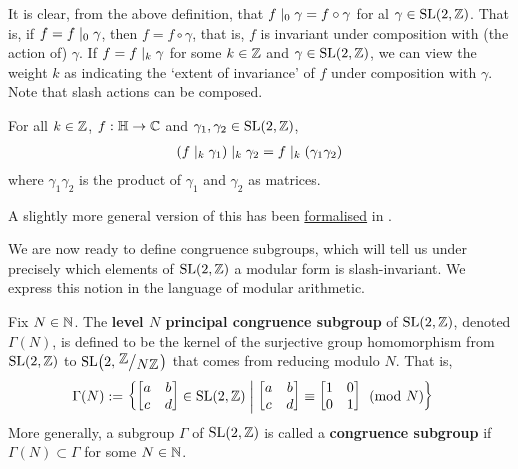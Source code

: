 It is clear, from the above definition, that $f \mid_0 \gamma = f \circ \gamma$ for al $\gamma \in \operatorname{SL}\!\left( 2, \mathbb{Z} \right)$. That is, if $f = f \mid_0 \gamma$, then $f = f \circ \gamma$, that is, $f$ is invariant under composition with (the action of) $\gamma$. If $f = f \mid_k \gamma$ for some $k \in \mathbb{Z}$ and $\gamma \in \operatorname{SL}\!\left( 2, \mathbb{Z} \right)$, we can view the weight $k$ as indicating the `extent of invariance' of $f$ under composition with $\gamma$. Note that slash actions can be composed.

\begin{boxlemma}\label{Ch2:Lemma:Slash_Mul}
    For all $k \in \mathbb{Z}$, $f : \mathbb{H} \to \mathbb{C}$ and $\gamma_1, \gamma_2 \in \operatorname{SL}\!\left( 2, \mathbb{Z} \right)$,
    \begin{align*}
        \left( f \mid_k \gamma_1 \right) \mid_k \gamma_2 = f \mid_k \left( \gamma_1 \gamma_2 \right)
    \end{align*}
    where $\gamma_1 \gamma_2$ is the product of $\gamma_1$ and $\gamma_2$ as matrices.
\end{boxlemma}
A slightly more general version of this has been \href{https://github.com/leanprover-community/mathlib4/blob/a0370507e2922f0a329a2d8cc17e9f9148cd168d/Mathlib/NumberTheory/ModularForms/SlashActions.lean#L77}{formalised} in \mathlib.

We are now ready to define congruence subgroups, which will tell us under precisely which elements of $\operatorname{SL}\!\left( 2, \mathbb{Z} \right)$ a modular form is slash-invariant. We express this notion in the language of modular arithmetic.

\begin{boxdefinition}\label{Ch2:Def:Cong_Subgroup}
    Fix $N \in \mathbb{N}$. The \textbf{level $N$ principal congruence subgroup} of $\operatorname{SL}\!\left( 2, \mathbb{Z} \right)$, denoted $\Gamma(N)$, is defined to be the kernel of the surjective group homomorphism from $\operatorname{SL}\!\left( 2, \mathbb{Z} \right)$ to $\SL{2, \Zmod{N}}$ that comes from reducing modulo $N$. That is,
    \begin{align}
        \Gamma(N) &:= \left\{ 
        \begin{bmatrix}
            a & b \\ c & d
        \end{bmatrix} \in \operatorname{SL}\!\left( 2, \mathbb{Z} \right) \; \middle\vert \; 
        \begin{bmatrix}
            a & b \\ c & d
        \end{bmatrix}
        \equiv
        \begin{bmatrix}
            1 & 0 \\ 0 & 1
        \end{bmatrix}
        \pmod{N} \right\}
        \label{Ch2:Eq:PrincipalCongruenceSubgroup_def}
    \end{align}
    More generally, a subgroup $\Gamma$ of $\operatorname{SL}\!\left( 2, \mathbb{Z} \right)$ is called a \textbf{congruence subgroup} if $\Gamma(N) \subset \Gamma$ for some $N \in \mathbb{N}$.
\end{boxdefinition}

